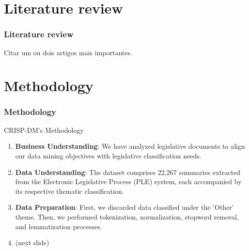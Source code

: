 \section{Literature review}
\begin{frame}
	\frametitle{Literature review}
	
	Citar um ou dois artigos mais importantes.
	
	
\end{frame}
\section{Methodology}
\begin{frame}
	\frametitle{Methodology}
	\begin{block}{CRISP-DM's Methodology} %
		\begin{enumerate}
			\item \textbf{Business Understanding}: We have analyzed legislative documents to align our data mining objectives with legislative classification needs.
			
			\item \textbf{Data Understanding}: The dataset comprises 22,267 summaries extracted from the Electronic Legislative Process (PLE) system, each accompanied by its respective thematic classification.
			
			\item \textbf{Data Preparation}: First, we discarded data classified under the 'Other' theme. Then, we performed tokenization, normalization, stopword removal, and lemmatization processes.
			
			\item (next slide)
		\end{enumerate}
	\end{block}
\end{frame}
